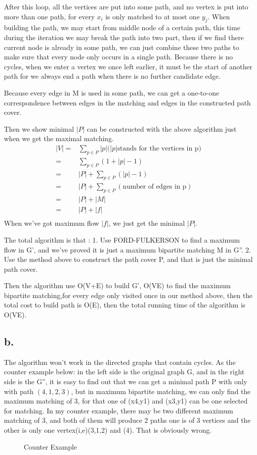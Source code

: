 \documentclass[oneside]{homework} %
\begin{document}
After this loop, all the vertices are put into some path, and no vertex is put into more than one path, for every $x_{i}$ is only matched to at most one $y_{j}$. When building the path, we may start from middle node of a certain path, this time during the iteration we may break the path into two part, then if we find there current node is already in some path, we can just combine these two paths to make sure that every node only occurs in a single path. Because there is no cycles, when we enter a vertex we once left earlier, it must be the start of another path for we always end a path when there is no further candidate edge.

Because every edge in M is used in some path, we can get a one-to-one correspondence between edges in the matching and edges in the constructed path cover.

Then we show minimal $|P|$ can be constructed with the above algorithm just when we get the maximal matching.
\begin{eqnarray*}
  |V| =& \sum\limits_{p \in P}|p| \text{($|p|$stands for the vertices in p)} \\
	    =& \sum\limits_{p \in P}(1+|p|-1)\\
		=& |P| + \sum\limits_{p \in P}(|p|-1)\\
		=& |P| + \sum\limits_{p \in P}(\text{number of edges in p})\\
		=& |P| + |M|\\
		=& |P| + |f|\\
\end{eqnarray*}
When we've got maximum flow $|f|$, we just get the minimal $|P|$.

The total algorithm is that :
1. Use FORD-FULKERSON to  find a maximum flow in G', and we've proved it is just a maximum bipartite matching M in G''.
2. Use the method above to construct the path cover P, and that is just the minimal path cover.

Then the algorithm use O(V+E) to build G', O(VE) to find the maximum bipartite matching,for every edge only visited once in our method above, then the total cost to build path is O(E), then the total running time of the algorithm is O(VE).
\newpage

\subsection*{b.}
The algorithm won't work in the directed graphs that contain cycles. As the counter example below: in the left side is the original graph G, and in the right side is the G'', it is easy to find out that we can get a minimal path P with only with path $ (4,1,2,3) $, but in maximum bipartite matching, we can only find the maximum matching of 3, for that one of (x4,y1) and (x3,y1) can be one selected for matching. In my counter example, there may be two different maximum matching of 3, and both of them will produce 2 paths one is of 3 vertices and the other is only one vertex(i,e)(3,1,2) and (4). That is obviously wrong.

\begin{figure}[!h]
  \centering
  \caption{Counter Example}
  \label{fig:ce2}
\end{figure}
\end{document}
